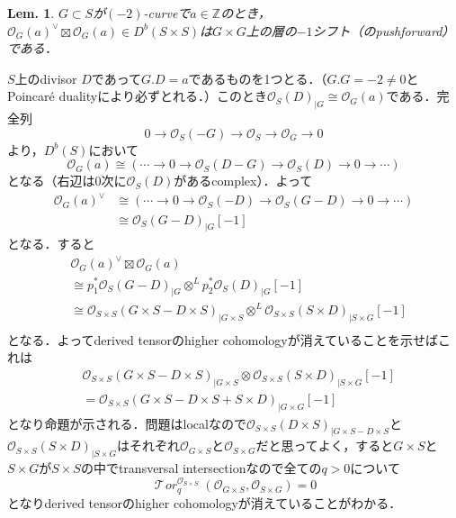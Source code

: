 \documentclass[uplatex,a4paper,11pt,dvipdfmx]{jsarticle}
\makeatletter
\theoremstyle{mystyle} %
\newtheorem{lemma}{Lem.}[section]
\renewenvironment{proof}[1][\proofname]{\par
 \pushQED{\qed}%
 \normalfont \topsep6\p@\@plus6\p@\relax
 \trivlist
 \item[\hskip\labelsep
 \itshape
 {\bf\underline{#1}}]\ignorespaces
}{%
 \popQED\endtrivlist\@endpefalse
}
\newcommand{\Torsheaf}{\mathop{\mathcal{T}\! \mathit{or}}\nolimits}
\makeatother
\begin{document}
\begin{lemma}\label{boxtimes_is_a_sheaf}
	$G \subset S$が$(-2)$-curveで$a \in \mathbb{Z}$のとき，$\mathcal{O}_G(a)^\vee \boxtimes \mathcal{O}_G(a) \in D^b(S\times S)$は$G\times G$上の層の$-1$シフト（のpushforward）である．
\end{lemma}
\begin{proof}
	$S$上のdivisor $D$であって$G.D = a$であるものを1つとる．（$G.G = -2 \neq 0$とPoincaré dualityにより必ずとれる．）このとき$\mathcal{O}_S(D)_{|G} \cong \mathcal{O}_G(a)$である．完全列$$0 \to \mathcal{O}_S(-G) \to \mathcal{O}_S \to \mathcal{O}_G \to 0$$より，$D^b(S)$において$$\mathcal{O}_G(a) \cong (\cdots \to 0 \to \mathcal{O}_S(D-G) \to \mathcal{O}_S(D) \to 0 \to \cdots)$$となる（右辺は$0$次に$\mathcal{O}_S(D)$があるcomplex）．よって
	\begin{align*}
		\mathcal{O}_G(a)^\vee & \cong (\cdots \to 0 \to \mathcal{O}_S(-D) \to \mathcal{O}_S(G-D) \to 0 \to \cdots) \\
		                      & \cong \mathcal{O}_S(G-D)_{|G}[-1]
	\end{align*}
	となる．すると
	\begin{align*}
		 & \mathcal{O}_G(a)^\vee \boxtimes \mathcal{O}_G(a)                                                                                 \\
		 & \cong p_1^*\mathcal{O}_S(G-D)_{|G} \otimes^L p_2^*\mathcal{O}_S(D)_{|G}[-1]                                                      \\
		 & \cong \mathcal{O}_{S\times S}(G\times S - D\times S)_{|G\times S} \otimes^L \mathcal{O}_{S\times S}(S \times D)_{|S\times G}[-1] \\
	\end{align*}
	となる．よってderived tensorのhigher cohomologyが消えていることを示せばこれは
	\begin{align*}
		 & \mathcal{O}_{S\times S}(G\times S - D\times S)_{|G\times S} \otimes \mathcal{O}_{S\times S}(S \times D)_{|S\times G}[-1] \\
		 & = \mathcal{O}_{S\times S}(G\times S - D\times S+S \times D)_{|G\times G}[-1]
	\end{align*}
	となり命題が示される．問題はlocalなので$\mathcal{O}_{S\times S}(D\times S)_{|G\times S - D\times S}$と$\mathcal{O}_{S\times S}(S \times D)_{|S\times G}$はそれぞれ$\mathcal{O}_{G\times S}$と$\mathcal{O}_{S\times G}$だと思ってよく，すると$G \times S$と$S \times G$が$S \times S$の中でtransversal intersectionなので全ての$q>0$について$$\Torsheaf_q^{\mathcal{O}_{S\times S}}(\mathcal{O}_{G\times S}, \mathcal{O}_{S\times G})=0$$となりderived tensorのhigher cohomologyが消えていることがわかる．
\end{proof}
\end{document}
